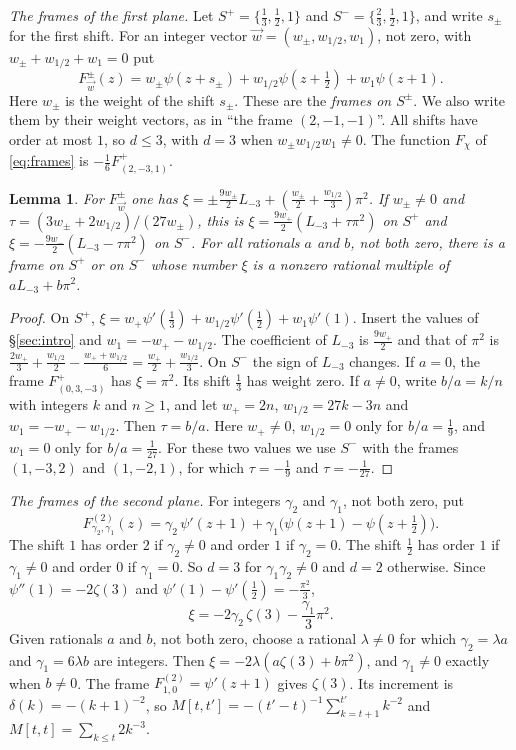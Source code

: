 \documentclass[11pt]{amsart}
\newtheorem{lemma}[theorem]{Lemma}
\theoremstyle{definition}
\theoremstyle{remark}
\numberwithin{equation}{section}
\newcommand{\Lt}{L_{-3}}             %
\begin{document}
\emph{The frames of the first plane.} Let $S^+=\{\frac13,\frac12,1\}$ and $S^-=\{\frac23,\frac12,1\}$, and write $s_\pm$
for the first shift. For an integer vector $\vec w=(w_\pm,w_{1/2},w_1)$, not zero, with $w_\pm+w_{1/2}+w_1=0$ put
\[
 F^\pm_{\vec w}(z)=w_\pm\psi(z+s_\pm)+w_{1/2}\psi(z+\tfrac12)+w_1\psi(z+1).
\]
Here $w_\pm$ is the weight of the shift $s_\pm$. These are the \emph{frames on $S^\pm$}. We also write them by their
weight vectors, as in ``the frame $(2,-1,-1)$''. All shifts have order at most $1$, so $d\le3$, with $d=3$ when
$w_\pm w_{1/2}w_1\ne0$. The function $F_\chi$ of \eqref{eq:frames} is $-\frac16F^+_{(2,-3,1)}$.

\begin{lemma}\label{lem:planeconst}
For $F^\pm_{\vec w}$ one has $\xi=\pm\frac{9w_\pm}2\Lt+(\frac{w_\pm}2+\frac{w_{1/2}}3)\pi^2$. If $w_\pm\ne0$ and
$\tau=(3w_\pm+2w_{1/2})/(27w_\pm)$, this is $\xi=\frac{9w_+}2(\Lt+\tau\pi^2)$ on $S^+$ and
$\xi=-\frac{9w_-}2(\Lt-\tau\pi^2)$ on $S^-$. For all rationals $a$ and $b$, not both zero, there is a frame on $S^+$
or on $S^-$ whose number $\xi$ is a nonzero rational multiple of $a\Lt+b\pi^2$.
\end{lemma}
\begin{proof}
On $S^+$, $\xi=w_+\psi'(\frac13)+w_{1/2}\psi'(\frac12)+w_1\psi'(1)$. Insert the values of \S\ref{sec:intro} and
$w_1=-w_+-w_{1/2}$. The coefficient of $\Lt$ is $\frac{9w_+}2$ and that of $\pi^2$ is
$\frac{2w_+}3+\frac{w_{1/2}}2-\frac{w_++w_{1/2}}6=\frac{w_+}2+\frac{w_{1/2}}3$. On $S^-$ the sign of $\Lt$ changes. If
$a=0$, the frame $F^+_{(0,3,-3)}$ has $\xi=\pi^2$. Its shift $\frac13$ has weight zero. If $a\ne0$, write $b/a=k/n$ with
integers $k$ and $n\ge1$, and let $w_+=2n$, $w_{1/2}=27k-3n$ and $w_1=-w_+-w_{1/2}$. Then $\tau=b/a$. Here $w_+\ne0$, $w_{1/2}=0$ only
for $b/a=\frac19$, and $w_1=0$ only for $b/a=\frac1{27}$. For these two values we use $S^-$ with the frames $(1,-3,2)$
and $(1,-2,1)$, for which $\tau=-\frac19$ and $\tau=-\frac1{27}$.
\end{proof}

\emph{The frames of the second plane.} For integers $\gamma_2$ and $\gamma_1$, not both zero, put
\[
 F^{(2)}_{\gamma_2,\gamma_1}(z)=\gamma_2\,\psi'(z+1)+\gamma_1\bigl(\psi(z+1)-\psi(z+\tfrac12)\bigr).
\]
The shift $1$ has order $2$ if $\gamma_2\ne0$ and order $1$ if $\gamma_2=0$. The shift $\frac12$ has order $1$ if
$\gamma_1\ne0$ and order $0$ if $\gamma_1=0$. So $d=3$ for $\gamma_1\gamma_2\ne0$ and $d=2$ otherwise. Since
$\psi''(1)=-2\zeta(3)$ and $\psi'(1)-\psi'(\frac12)=-\frac{\pi^2}3$,
\[
 \xi=-2\gamma_2\,\zeta(3)-\frac{\gamma_1}3\pi^2 .
\]
Given rationals $a$ and $b$, not both zero, choose a rational $\lambda\ne0$ for which $\gamma_2=\lambda a$ and
$\gamma_1=6\lambda b$ are integers. Then $\xi=-2\lambda(a\zeta(3)+b\pi^2)$, and $\gamma_1\ne0$ exactly when
$b\ne0$. The frame $F^{(2)}_{1,0}=\psi'(z+1)$ gives $\zeta(3)$. Its increment is $\delta(k)=-(k+1)^{-2}$, so
$M[t,t']=-(t'-t)^{-1}\sum_{k=t+1}^{t'}k^{-2}$ and $M[t,t]=\sum_{k\le t}2k^{-3}$.
\end{document}
